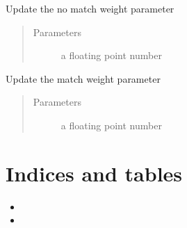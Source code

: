 \documentclass[letterpaper,10pt,english]{sphinxmanual}
\begin{document}
\begin{fulllineitems}
\begin{fulllineitems}
\label{\detokenize{customParameters:objects.customParameters.customParameters.setNoMatchWeight}}
Update the no match weight parameter
\begin{quote}\begin{description}
\item[{Parameters}] \leavevmode
{} \textendash{} a floating point number

\end{description}\end{quote}

\end{fulllineitems}


\begin{fulllineitems}
\label{\detokenize{customParameters:objects.customParameters.customParameters.setMatchWeight}}
Update the match weight parameter
\begin{quote}\begin{description}
\item[{Parameters}] \leavevmode
{} \textendash{} a floating point number

\end{description}\end{quote}

\end{fulllineitems}


\end{fulllineitems}


\begin{DUlineblock}{0em}
\item[] 
\end{DUlineblock}

{\hyperref[\detokenize{index:mastertoc}]{}}


\chapter{Indices and tables}
\label{\detokenize{index:indices-and-tables}}\begin{itemize}
\item {} 

\item {} 

\end{itemize}



\renewcommand{\indexname}{Index}
\printindex
\end{document}
